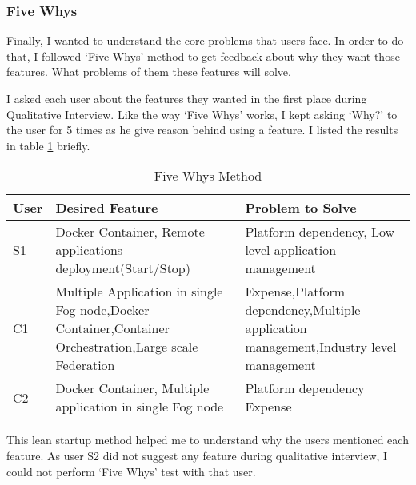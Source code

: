 \subsubsection{Five Whys}

Finally, I wanted to understand the core problems that users face. In order to do that, I followed `Five Whys' method to get feedback about why they want those features. What problems of them these features will solve.

I asked each user about the features they wanted in the first place during Qualitative Interview. Like the way `Five Whys' works\cite[p.~212]{leanstartup}, I kept asking `Why?' to the user for 5 times as he give reason behind using a feature. I listed the results in table \ref{table:fivewhys} briefly.

\begin{table}[H]
\centering
  \begin{tabular}{ | l | p{60mm} | p{60mm} |}
    \hline
    User & Desired Feature & Problem to Solve \\ \hline
    S1 & Docker Container, \newline Remote applications deployment(Start/Stop) & Platform dependency, \newline Low level application management \\ \hline
    
    C1   &   Multiple Application in single Fog node,\newline Docker Container,\newline Container Orchestration,\newline Large scale Federation & Expense,\newline\newline Platform dependency,\newline Multiple application management,\newline Industry level management \\\hline
    C2   & Docker Container, \newline Multiple application in single Fog node & Platform dependency \newline Expense \\\hline
  \end{tabular}
  \caption{Five Whys Method}
  \label{table:fivewhys}
\end{table}

This lean startup method helped me to understand why the users mentioned each feature. As user S2 did not suggest any feature during qualitative interview, I could not perform `Five Whys' test with that user.

